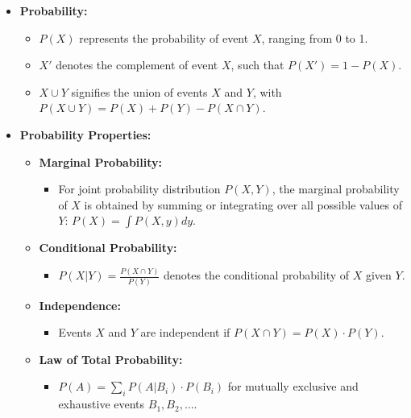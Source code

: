 \documentclass{article}
\begin{document}
\begin{itemize}
  \item \textbf{Probability:}
  \begin{itemize}
    \item $P(X)$ represents the probability of event $X$, ranging from 0 to 1.
    \item $X'$ denotes the complement of event $X$, such that $P(X') = 1 - P(X)$.
    \item $X \cup Y$ signifies the union of events $X$ and $Y$, with $P(X \cup Y) = P(X) + P(Y) - P(X \cap Y)$.
  \end{itemize}

  \item \textbf{Probability Properties:}
  \begin{itemize}
    \item \textbf{Marginal Probability:}
    \begin{itemize}
      \item For joint probability distribution $P(X, Y)$, the marginal probability of $X$ is obtained by summing or integrating over all possible values of $Y$: $P(X) = \int P(X, y) dy$.
    \end{itemize}
    \item \textbf{Conditional Probability:}
    \begin{itemize}
      \item $P(X|Y) = \frac{P(X \cap Y)}{P(Y)}$ denotes the conditional probability of $X$ given $Y$.
    \end{itemize}
    \item \textbf{Independence:}
    \begin{itemize}
      \item Events $X$ and $Y$ are independent if $P(X \cap Y) = P(X) \cdot P(Y)$.
    \end{itemize}
    \item \textbf{Law of Total Probability:}
    \begin{itemize}
      \item $P(A) = \sum_{i} P(A|B_i) \cdot P(B_i)$ for mutually exclusive and exhaustive events $B_1, B_2, \ldots$.
    \end{itemize}
  \end{itemize}


\end{itemize}
\end{document}
